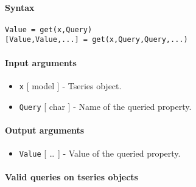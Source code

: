 


	\paragraph{Syntax}\label{syntax}

\begin{verbatim}
Value = get(x,Query)
[Value,Value,...] = get(x,Query,Query,...)
\end{verbatim}

\paragraph{Input arguments}\label{input-arguments}

\begin{itemize}
\item
  \texttt{x} {[} model {]} - Tseries object.
\item
  \texttt{Query} {[} char {]} - Name of the queried property.
\end{itemize}

\paragraph{Output arguments}\label{output-arguments}

\begin{itemize}
\itemsep1pt\parskip0pt
\item
  \texttt{Value} {[} \ldots{} {]} - Value of the queried property.
\end{itemize}

\paragraph{Valid queries on tseries
objects}\label{valid-queries-on-tseries-objects}

